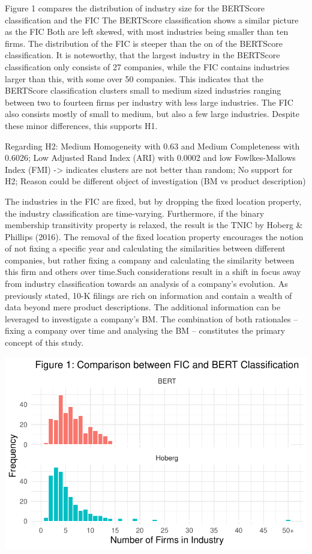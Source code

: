 \documentclass[
]{article}
\begin{document}
Figure 1 compares the distribution of industry size for the BERTScore
classification and the FIC The BERTScore classification shows a similar
picture as the FIC Both are left skewed, with most industries being
smaller than ten firms. The distribution of the FIC is steeper than the
on of the BERTScore classification. It is noteworthy, that the largest
industry in the BERTScore classification only consists of 27 companies,
while the FIC contains industries larger than this, with some over 50
companies. This indicates that the BERTScore classification clusters
small to medium sized industries ranging between two to fourteen firms
per industry with less large industries. The FIC also consists mostly of
small to medium, but also a few large industries. Despite these minor
differences, this supports H1.

Regarding H2: Medium Homogeneity with 0.63 and Medium Completeness with
0.6026; Low Adjusted Rand Index (ARI) with 0.0002 and low
Fowlkes-Mallows Index (FMI) -\textgreater{} indicates clusters are not
better than random; No support for H2; Reason could be different object
of investigation (BM vs product description)

The industries in the FIC are fixed, but by dropping the fixed location
property, the industry classification are time-varying. Furthermore, if
the binary membership transitivity property is relaxed, the result is
the TNIC by Hoberg \& Phillips (2016). The removal of the fixed location
property encourages the notion of not fixing a specific year and
calculating the similarities between different companies, but rather
fixing a company and calculating the similarity between this firm and
others over time.Such considerations result in a shift in focus away
from industry classification towards an analysis of a company's
evolution. As previously stated, 10-K filings are rich on information
and contain a wealth of data beyond mere product descriptions. The
additional information can be leveraged to investigate a company's BM.
The combination of both rationales -- fixing a company over time and
analysing the BM -- constitutes the primary concept of this study.

\includegraphics{ProjectEcoDataScience_files/figure-pdf/unnamed-chunk-4-1.pdf}
\end{document}
